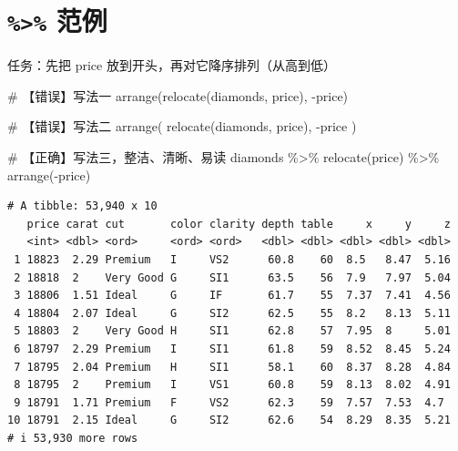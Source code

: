 \documentclass[
  letterpaper,
]{ctexbook}
\newenvironment{Shaded}{\begin{snugshade}}{\end{snugshade}}
\newcommand{\CommentTok}[1]{\textcolor[rgb]{0.37,0.37,0.37}{#1}}
\newcommand{\FunctionTok}[1]{\textcolor[rgb]{0.28,0.35,0.67}{#1}}
\newcommand{\NormalTok}[1]{\textcolor[rgb]{0.00,0.23,0.31}{#1}}
\newcommand{\SpecialCharTok}[1]{\textcolor[rgb]{0.37,0.37,0.37}{#1}}
\begin{document}
\hypertarget{ux8303ux4f8b}{%
\section{\texorpdfstring{\texttt{\%\textgreater{}\%}
范例}{\%\textgreater\% 范例}}\label{ux8303ux4f8b}}

任务：先把 price 放到开头，再对它降序排列（从高到低）

\begin{Shaded}
\begin{Highlighting}[]
\CommentTok{\# 【错误】写法一}
\FunctionTok{arrange}\NormalTok{(}\FunctionTok{relocate}\NormalTok{(diamonds, price), }\SpecialCharTok{{-}}\NormalTok{price)}

\CommentTok{\# 【错误】写法二}
\FunctionTok{arrange}\NormalTok{(}
  \FunctionTok{relocate}\NormalTok{(diamonds, price),}
  \SpecialCharTok{{-}}\NormalTok{price}
\NormalTok{)}
\end{Highlighting}
\end{Shaded}

\begin{Shaded}
\begin{Highlighting}[]
\CommentTok{\# 【正确】写法三，整洁、清晰、易读}
\NormalTok{diamonds }\SpecialCharTok{\%\textgreater{}\%}
  \FunctionTok{relocate}\NormalTok{(price) }\SpecialCharTok{\%\textgreater{}\%}
  \FunctionTok{arrange}\NormalTok{(}\SpecialCharTok{{-}}\NormalTok{price)}
\end{Highlighting}
\end{Shaded}

\begin{verbatim}
# A tibble: 53,940 x 10
   price carat cut       color clarity depth table     x     y     z
   <int> <dbl> <ord>     <ord> <ord>   <dbl> <dbl> <dbl> <dbl> <dbl>
 1 18823  2.29 Premium   I     VS2      60.8    60  8.5   8.47  5.16
 2 18818  2    Very Good G     SI1      63.5    56  7.9   7.97  5.04
 3 18806  1.51 Ideal     G     IF       61.7    55  7.37  7.41  4.56
 4 18804  2.07 Ideal     G     SI2      62.5    55  8.2   8.13  5.11
 5 18803  2    Very Good H     SI1      62.8    57  7.95  8     5.01
 6 18797  2.29 Premium   I     SI1      61.8    59  8.52  8.45  5.24
 7 18795  2.04 Premium   H     SI1      58.1    60  8.37  8.28  4.84
 8 18795  2    Premium   I     VS1      60.8    59  8.13  8.02  4.91
 9 18791  1.71 Premium   F     VS2      62.3    59  7.57  7.53  4.7 
10 18791  2.15 Ideal     G     SI2      62.6    54  8.29  8.35  5.21
# i 53,930 more rows
\end{verbatim}
\end{document}
